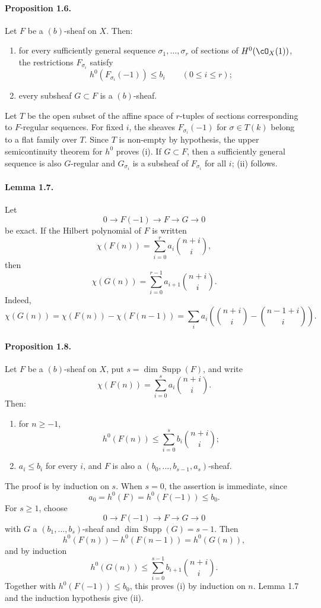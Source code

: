 \documentclass[11pt]{article}
\theoremstyle{plain}
\theoremstyle{definition}
\theoremstyle{remark}
\begin{document}
\paragraph{Proposition 1.6.}
Let $F$ be a $(b)$-sheaf on $X$. Then:
\begin{enumerate}[label=\roman*)]
\item for every sufficiently general sequence $\sigma_1,\ldots,\sigma_r$ of sections of $H^0(\cO_X(1))$, the restrictions $F_{\sigma_i}$ satisfy
\[
h^0(F_{\sigma_i}(-1))\leq b_i\qquad(0\leq i\leq r);
\]
\item every subsheaf $G\subset F$ is a $(b)$-sheaf.
\end{enumerate}

Let $T$ be the open subset of the affine space of $r$-tuples of sections corresponding to $F$-regular sequences. For fixed $i$, the sheaves $F_{\sigma_i}(-1)$ for $\sigma\in T(k)$ belong to a flat family over $T$. Since $T$ is non-empty by hypothesis, the upper semicontinuity theorem for $h^0$ proves (i). If $G\subset F$, then a sufficiently general sequence is also $G$-regular and $G_{\sigma_i}$ is a subsheaf of $F_{\sigma_i}$ for all $i$; (ii) follows.

\paragraph{Lemma 1.7.}
Let
\[
0\to F(-1)\to F\to G\to0
\]
be exact. If the Hilbert polynomial of $F$ is written
\[
\chi(F(n))=\sum_{i=0}^r a_i\binom{n+i}{i},
\]
then
\[
\chi(G(n))=\sum_{i=0}^{r-1}a_{i+1}\binom{n+i}{i}.
\]
Indeed,
\[
\chi(G(n))=\chi(F(n))-\chi(F(n-1))
 =\sum_i a_i\left(\binom{n+i}{i}-\binom{n-1+i}{i}\right).
\]

\paragraph{Proposition 1.8.}
Let $F$ be a $(b)$-sheaf on $X$, put $s=\dim\operatorname{Supp}(F)$, and write
\[
\chi(F(n))=\sum_{i=0}^s a_i\binom{n+i}{i}.
\]
Then:
\begin{enumerate}[label=\roman*)]
\item for $n\geq -1$,
\[
h^0(F(n))\leq \sum_{i=0}^s b_i\binom{n+i}{i};
\]
\item $a_i\leq b_i$ for every $i$, and $F$ is also a $(b_0,\ldots,b_{s-1},a_s)$-sheaf.
\end{enumerate}

The proof is by induction on $s$. When $s=0$, the assertion is immediate, since
\[
a_0=h^0(F)=h^0(F(-1))\leq b_0.
\]
For $s\geq1$, choose
\[
0\to F(-1)\to F\to G\to0
\]
with $G$ a $(b_1,\ldots,b_s)$-sheaf and $\dim\operatorname{Supp}(G)=s-1$. Then
\[
h^0(F(n))-h^0(F(n-1))=h^0(G(n)),
\]
and by induction
\[
h^0(G(n))\leq\sum_{i=0}^{s-1} b_{i+1}\binom{n+i}{i}.
\]
Together with $h^0(F(-1))\leq b_0$, this proves (i) by induction on $n$. Lemma 1.7 and the induction hypothesis give (ii).
\end{document}
